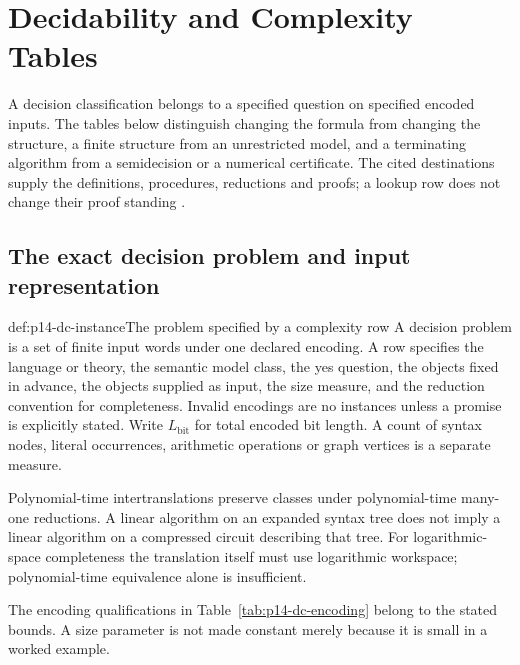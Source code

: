 \chapter{Decidability and Complexity Tables}
\label{sec:p14-decidability-and-complexity}

A decision classification belongs to a specified question on specified
encoded inputs. The tables below distinguish changing the formula from
changing the structure, a finite structure from an unrestricted model,
and a terminating algorithm from a semidecision or a numerical certificate.
The cited destinations supply the definitions, procedures, reductions and
proofs; a lookup row does not change their proof standing
\cite{AroraBarak2009,AbiteboulHullVianu1995,BlackburnDeRijkeVenema2001}.

\section{The exact decision problem and input representation}
\label{sec:p14-dc-input}

\begin{hbdefinition}{def:p14-dc-instance}{The problem specified by a complexity row}
A decision problem is a set of finite input words under one declared
encoding. A row specifies the language or theory, the semantic model class,
the yes question, the objects fixed in advance, the objects supplied as
input, the size measure, and the reduction convention for completeness.
Invalid encodings are no instances unless a promise is explicitly stated.
Write \(L_{\mathrm{bit}}\) for total encoded bit length.
A count of syntax nodes, literal occurrences, arithmetic operations or
graph vertices is a separate measure.

Polynomial-time intertranslations preserve classes under polynomial-time
many-one reductions. A linear algorithm on an expanded syntax tree does
not imply a linear algorithm on a compressed circuit describing that tree.
For logarithmic-space completeness the translation itself must use
logarithmic workspace; polynomial-time equivalence alone is insufficient.
\end{hbdefinition}

The encoding qualifications in Table~\ref{tab:p14-dc-encoding} belong to the
stated bounds. A size parameter is not made constant merely because it is
small in a worked example.

